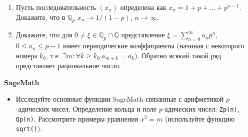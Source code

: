 \begin{enumerate}[topsep=0pt]
    \item Пусть последовательность $(x_n)$ определена как $x_n = 1+p+\dots +p^{n-1}$. Докажите, что в $\mathbb{Q}_p$ $x_n \rightarrow 1/(1-p)$, $n \rightarrow \infty$. %

    
    \item Докажите, что для $0 \neq \xi \in \mathbb{Q}_p \cap \mathbb{Q}$ представление $\xi = \sum_{n=0}^{\infty} a_n p^n$, $0 \leqslant a_n \leqslant p-1$ имеет периодические коэффициенты (начиная с некоторого номера $k_0$, т.е. $\exists m: \forall k \ge k_0\ a_{m+k} = a_{k}$). Обратно всякий такой ряд представляет рациональное число.
    
\end{enumerate}

\noindent\textbf{SageMath}

\begin{itemize}[topsep=0pt]
    \item Исследуйте основные функции SageMath связанные с арифметикой $p$-адических чисел. Определение кольца и поле $p$-адических чисел: \texttt{Zp(n)}, \texttt{Qp(n)}. Рассмотрите примеры уравнения $x^2=m$ (используйте функцию \texttt{sqrt()}).
        
\end{itemize}



